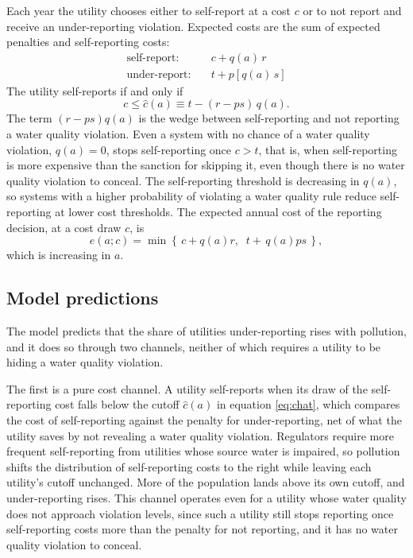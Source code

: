 \documentclass[12pt]{article}
\begin{document}
	Each year the utility chooses either to self-report at a cost $c$ or to not report and receive an under-reporting violation. Expected costs are the sum of expected penalties and self-reporting costs:
	\begin{align*}
		\text{self-report:} \quad & c + q(a)\,r \\
		\text{under-report:} \quad & t + p\left[q(a)\,s\right]
	\end{align*}
	The utility self-reports if and only if
	\begin{equation}\label{eq:chat}
		c \le \hat{c}(a) \equiv t - (r - ps)\,q(a).
	\end{equation}
	The term $(r - ps)q(a)$ is the wedge between self-reporting and not reporting a water quality violation. Even a system with no chance of a water quality violation, $q(a) = 0$, stops self-reporting once $c > t$, that is, when self-reporting is more expensive than the sanction for skipping it, even though there is no water quality violation to conceal. The self-reporting threshold is decreasing in $q(a)$, so systems with a higher probability of violating a water quality rule reduce self-reporting at lower cost thresholds. The expected annual cost of the reporting decision, at a cost draw $c$, is
	\begin{equation}\label{eq:endog_penalty}
		e(a;c) = \min\left\{\, c + q(a)r,\;\; t + \,q(a)ps \,\right\},
	\end{equation}
	which is increasing in $a$.
	
	\subsection{Model predictions}

	The model predicts that the share of utilities under-reporting rises with pollution, and it does so through two channels, neither of which requires a utility to be hiding a water quality violation.

	The first is a pure cost channel. A utility self-reports when its draw of the self-reporting cost falls below the cutoff $\hat{c}(a)$ in equation \eqref{eq:chat}, which compares the cost of self-reporting against the penalty for under-reporting, net of what the utility saves by not revealing a water quality violation. Regulators require more frequent self-reporting from utilities whose source water is impaired, so pollution shifts the distribution of self-reporting costs to the right while leaving each utility's cutoff unchanged. More of the population lands above its own cutoff, and under-reporting rises. This channel operates even for a utility whose water quality does not approach violation levels, since such a utility still stops reporting once self-reporting costs more than the penalty for not reporting, and it has no water quality violation to conceal.
\end{document}

